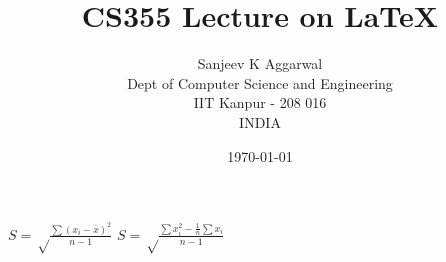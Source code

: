 \documentclass{article}
\title{CS355 Lecture on \LaTeX}
\author{Sanjeev K Aggarwal\\Dept of Computer Science and Engineering\\IIT
Kanpur - 208 016\\INDIA}
\date{\today}
\begin{document}

$S = \sqrt \frac{\sum { } { } (x_{i} - \overline{x} )^{2}} {n-1}$ \hspace*{1in}
$S = \sqrt \frac{\sum { } { } x_{i}^{2} - \frac{1}{n} \sum x_{i} }{n-1}$ 

\end{document}
